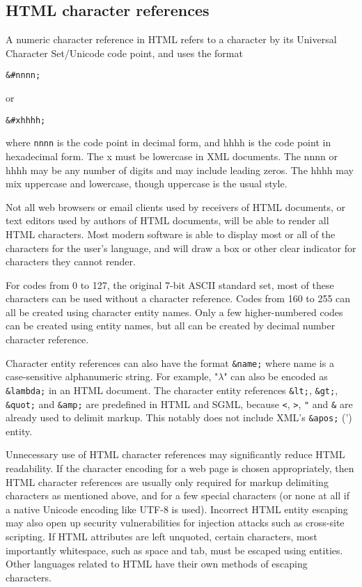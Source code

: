 \subsection{HTML character references}


A numeric character reference in HTML refers to a character by its Universal Character Set/Unicode code point, and uses the format

\verb|&#nnnn;|

or 

\verb|&#xhhhh;|

where \texttt{nnnn} is the code point in decimal form, and hhhh is the code point in hexadecimal form. The x must be lowercase in XML documents. The nnnn or hhhh may be any number of digits and may include leading zeros. The hhhh may mix uppercase and lowercase, though uppercase is the usual style.

Not all web browsers or email clients used by receivers of HTML documents, or text editors used by authors of HTML documents, will be able to render all HTML characters. Most modern software is able to display most or all of the characters for the user's language, and will draw a box or other clear indicator for characters they cannot render.

For codes from 0 to 127, the original 7-bit ASCII standard set, most of these characters can be used without a character reference. Codes from 160 to 255 can all be created using character entity names. Only a few higher-numbered codes can be created using entity names, but all can be created by decimal number character reference.

Character entity references can also have the format \texttt{\&name;} where name is a case-sensitive alphanumeric string. For example, "$\lambda$" can also be encoded as \texttt{\&lambda;} in an HTML document. The character entity references \texttt{\&lt;}, \texttt{\&gt;}, \texttt{\&quot;} and \texttt{\&amp;} are predefined in HTML and SGML, because \texttt{<}, \texttt{>}, \texttt{"} and \texttt{\&} are already used to delimit markup. This notably does not include XML's \texttt{\&apos;} (') entity. 

Unnecessary use of HTML character references may significantly reduce HTML readability. If the character encoding for a web page is chosen appropriately, then HTML character references are usually only required for markup delimiting characters as mentioned above, and for a few special characters (or none at all if a native Unicode encoding like UTF-8 is used). Incorrect HTML entity escaping may also open up security vulnerabilities for injection attacks such as cross-site scripting. If HTML attributes are left unquoted, certain characters, most importantly whitespace, such as space and tab, must be escaped using entities. Other languages related to HTML have their own methods of escaping characters.






